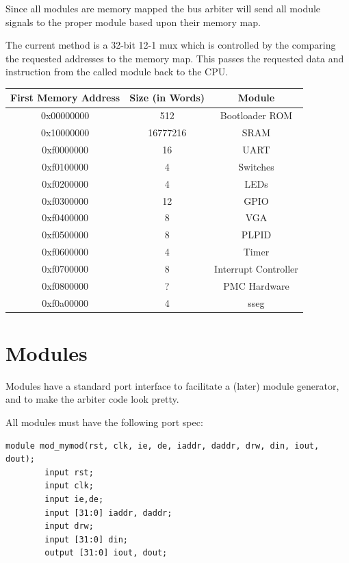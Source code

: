 \documentclass{article}
\begin{document}
Since all modules are memory mapped the bus arbiter will send all module signals to the proper module based upon their memory map.

The current method is a 32-bit 12-1 mux which is controlled by the comparing the requested addresses to the memory map. This passes the requested data and instruction from the called module back to the CPU.

\begin{tabular}{|c|c|c|}
\hline
\textbf{First Memory Address} & \textbf{Size} (in Words) & \textbf{Module}   \\ \hline
\hline 0x00000000 & 512      & Bootloader ROM \\ 
\hline 0x10000000 & 16777216 & SRAM \\ 
\hline 0xf0000000 & 16       & UART \\ 
\hline 0xf0100000 & 4        & Switches \\ 
\hline 0xf0200000 & 4        & LEDs \\  
\hline 0xf0300000 & 12       & GPIO \\ 
\hline 0xf0400000 & 8        & VGA \\
\hline 0xf0500000 & 8        & PLPID \\ 
\hline 0xf0600000 & 4        & Timer \\ 
\hline 0xf0700000 & 8        & Interrupt Controller \\ 
\hline 0xf0800000 & ?        & PMC Hardware \\ 
\hline 0xf0a00000 & 4        & sseg \\
\hline 
\end{tabular}  

\section{Modules}

Modules have a standard port interface to facilitate a (later) module generator, and to make the arbiter code look pretty.

All modules must have the following port spec:

\begin{verbatim}
module mod_mymod(rst, clk, ie, de, iaddr, daddr, drw, din, iout, dout);
        input rst;
        input clk;
        input ie,de;
        input [31:0] iaddr, daddr;
        input drw;
        input [31:0] din;
        output [31:0] iout, dout;
\end{verbatim}
\end{document}
